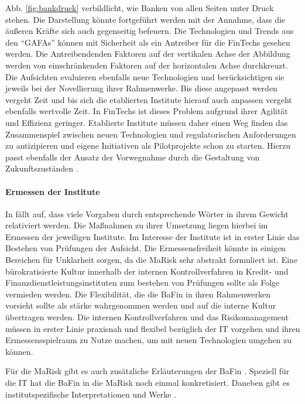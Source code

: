 \medskip
Abb. \ref{fig:bankdruck} verbildlicht, wie Banken von allen Seiten unter Druck stehen. Die Darstellung könnte fortgeführt werden mit der Annahme, dass die äußeren Kräfte sich auch gegenseitig befeuern. Die Technologien und Trends aus den \enquote{GAFAs} können mit Sicherheit als ein Antreiber für die FinTechs gesehen werden. Die Antreibendenden Faktoren auf der vertikalen Achse der Abbildung werden von einschränkenden Faktoren auf der horizontalen Achse durchkreuzt. Die Aufsichten evaluieren ebenfalls neue Technologien und berücksichtigen sie jeweils bei der Novellierung ihrer Rahmenwerke. Bis diese angepasst werden vergeht Zeit und bis sich die etablierten Institute hierauf auch anpassen vergeht ebenfalls wertvolle Zeit. In FinTechs ist dieses Problem aufgrund ihrer Agilität und Effizienz geringer. Etablierte Institute müssen daher einen Weg finden das Zusammenspiel zwischen neuen Technologien und regulatorischen Anforderungen zu antizipieren und eigene Initiativen als Pilotprojekte schon zu starten. Hierzu passt ebenfalls der Ansatz der Vorwegnahme durch die Gestaltung von Zukunftszuständen \cite{Alt2017}.


\paragraph{Ermessen der Institute}
In \cite{MaRisk:2017, BAIT:2018} fällt auf, dass viele Vorgaben durch entsprechende Wörter in ihrem Gewicht relativiert werden. Die Maßnahmen zu ihrer Umsetzung liegen hierbei im Ermessen der jeweiligen Institute. Im Interesse der Institute ist in erster Linie das Bestehen von Prüfungen der Aufsicht. Die Ermessensfreiheit könnte in einigen Bereichen für Unklarheit sorgen, da die \ac{MaRisk} sehr abstrakt formuliert ist.
Eine bürokratisierte Kultur innerhalb der internen Kontrollverfahren in Kredit- und Finanzdienstleistungsinstituten zum bestehen von Prüfungen sollte als Folge vermieden werden. Die Flexibilität, die die BaFin in ihren Rahmenwerken vorsieht \cite{MaRisk:2017} sollte als stärke wahrgenommen werden und auf die interne Kultur übertragen werden. Die internen Kontrollverfahren und das Risikomanagement müssen in erster Linie praxisnah und flexibel bezüglich der IT vorgehen und ihren Ermessensspielraum zu Nutze machen, um mit neuen Technologien umgehen zu können.

Für die \ac{MaRisk} gibt es auch zusätzliche Erläuterungen der BaFin \cite{MaRiskErläuterungen:2017}. Speziell für die IT hat die BaFin in \cite{BAIT:2018} die \ac{MaRisk} noch einmal konkretisiert. Daneben gibt es institutspezifische Interpretationen und Werke \cite{DSGV:2019}.

